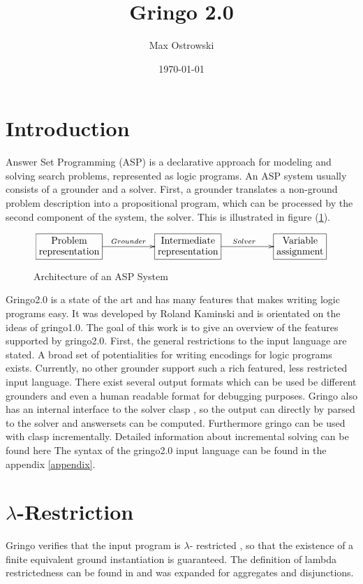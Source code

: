 \documentclass[a4paper,10pt]{article}
\author{Max Ostrowski}
\title{Gringo 2.0}
\date{\today}
\begin{document}
\maketitle
\tableofcontents
\section{Introduction}
Answer Set Programming (ASP) \cite{baral02a} is a declarative approach for modeling and solving search problems, represented as logic programs.
An ASP system usually consists of a grounder and a solver.
First, a grounder translates a non-ground problem description into a propositional program, which can be processed by the second component of the system, the solver. This is illustrated in figure (\ref{fig:ASP}).
\begin{figure}[h]
\[
\xymatrix{*+[F]\txt{Problem\\representation}\ar[rr]^{Grounder}&&
		*+[F]\txt{Intermediate\\ representation} \ar[rr]^{Solver}&&
		*+[F]\txt{Variable\\ assignment}}
\]
\caption{Architecture of an ASP System}
\label{fig:ASP}
\end{figure}
Gringo2.0 is a state of the art and has many features that makes writing logic programs easy.
It was developed by Roland Kaminski and is orientated on the ideas of gringo1.0.
The goal of this work is to give an overview of the features supported by gringo2.0. First, the general restrictions to the input language are stated. A broad set of potentialities for writing encodings for logic programs exists. Currently, no other grounder support such a rich featured, less restricted input language.
There exist several output formats which can be used be different grounders and even a human readable format for debugging purposes.
Gringo also has an internal interface to the solver clasp \cite{gekanesc07b}, so the output can directly by parsed to the solver and answersets can be computed.
Furthermore gringo can be used with clasp incrementally. Detailed information about incremental solving can be found here \cite{IncrementalASP} 
The syntax of the gringo2.0 input language can be found in the appendix \ref{appendix}.

\section{$\lambda$-Restriction}
\label{domainrestricted}
Gringo verifies that the input program is $\lambda$-
restricted \cite{gringopaper}, so that the existence of a finite equivalent ground instantiation is guaranteed. The definition of lambda restrictedness can be found in \cite{gringopaper} and was expanded for aggregates and disjunctions.
\end{document}
